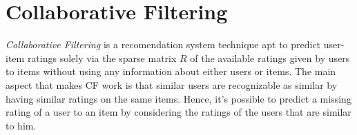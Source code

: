 \section{Collaborative Filtering}

\emph{Collaborative Filtering}\cite{Bobadilla2013} is a recomendation system 
technique apt to predict user-item ratings solely via the sparse 
matrix $\mathit{R}$ of the available ratings given by users to items
without using any information about either users or items.
The main aspect that makes CF work is that similar users are recognizable as similar
by having similar ratings on the same items.
Hence, it's possible to predict a missing rating of a user to an item
by considering the ratings of the users that are similar to him.

\begin{nalign}
\end{nalign}
